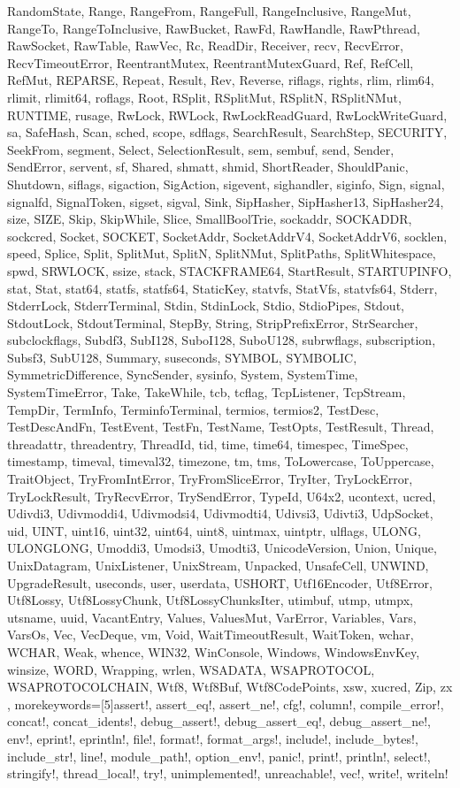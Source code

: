 {{RandomState, Range, RangeFrom, RangeFull, RangeInclusive, RangeMut, RangeTo,
RangeToInclusive, RawBucket, RawFd, RawHandle, RawPthread, RawSocket, RawTable,
RawVec, Rc, ReadDir, Receiver, recv, RecvError, RecvTimeoutError,
ReentrantMutex, ReentrantMutexGuard, Ref, RefCell, RefMut, REPARSE, Repeat,
Result, Rev, Reverse, riflags, rights, rlim, rlim64, rlimit, rlimit64, roflags,
Root, RSplit, RSplitMut, RSplitN, RSplitNMut, RUNTIME, rusage, RwLock, RWLock,
RwLockReadGuard, RwLockWriteGuard, sa, SafeHash, Scan, sched, scope, sdflags,
SearchResult, SearchStep, SECURITY, SeekFrom, segment, Select, SelectionResult,
sem, sembuf, send, Sender, SendError, servent, sf, Shared, shmatt, shmid,
ShortReader, ShouldPanic, Shutdown, siflags, sigaction, SigAction, sigevent,
sighandler, siginfo, Sign, signal, signalfd, SignalToken, sigset, sigval, Sink,
SipHasher, SipHasher13, SipHasher24, size, SIZE, Skip, SkipWhile, Slice,
SmallBoolTrie, sockaddr, SOCKADDR, sockcred, Socket, SOCKET, SocketAddr,
SocketAddrV4, SocketAddrV6, socklen, speed, Splice, Split, SplitMut, SplitN,
SplitNMut, SplitPaths, SplitWhitespace, spwd, SRWLOCK, ssize, stack,
STACKFRAME64, StartResult, STARTUPINFO, stat, Stat, stat64, statfs, statfs64,
StaticKey, statvfs, StatVfs, statvfs64, Stderr, StderrLock, StderrTerminal,
Stdin, StdinLock, Stdio, StdioPipes, Stdout, StdoutLock, StdoutTerminal, StepBy,
String, StripPrefixError, StrSearcher, subclockflags, Subdf3, SubI128, SuboI128,
SuboU128, subrwflags, subscription, Subsf3, SubU128, Summary, suseconds, SYMBOL,
SYMBOLIC, SymmetricDifference, SyncSender, sysinfo, System, SystemTime,
SystemTimeError, Take, TakeWhile, tcb, tcflag, TcpListener, TcpStream, TempDir,
TermInfo, TerminfoTerminal, termios, termios2, TestDesc, TestDescAndFn,
TestEvent, TestFn, TestName, TestOpts, TestResult, Thread, threadattr,
threadentry, ThreadId, tid, time, time64, timespec, TimeSpec, timestamp,
timeval, timeval32, timezone, tm, tms, ToLowercase, ToUppercase, TraitObject,
TryFromIntError, TryFromSliceError, TryIter, TryLockError, TryLockResult,
TryRecvError, TrySendError, TypeId, U64x2, ucontext, ucred, Udivdi3, Udivmoddi4,
Udivmodsi4, Udivmodti4, Udivsi3, Udivti3, UdpSocket, uid, UINT, uint16, uint32,
uint64, uint8, uintmax, uintptr, ulflags, ULONG, ULONGLONG, Umoddi3, Umodsi3,
Umodti3, UnicodeVersion, Union, Unique, UnixDatagram, UnixListener, UnixStream,
Unpacked, UnsafeCell, UNWIND, UpgradeResult, useconds, user, userdata, USHORT,
Utf16Encoder, Utf8Error, Utf8Lossy, Utf8LossyChunk, Utf8LossyChunksIter,
utimbuf, utmp, utmpx, utsname, uuid, VacantEntry, Values, ValuesMut, VarError,
Variables, Vars, VarsOs, Vec, VecDeque, vm, Void, WaitTimeoutResult, WaitToken,
wchar, WCHAR, Weak, whence, WIN32, WinConsole, Windows, WindowsEnvKey, winsize,
WORD, Wrapping, wrlen, WSADATA, WSAPROTOCOL, WSAPROTOCOLCHAIN, Wtf8, Wtf8Buf,
Wtf8CodePoints, xsw, xucred, Zip, zx}
%
, morekeywords=[5]{assert!, assert_eq!, assert_ne!, cfg!, column!,
compile_error!, concat!, concat_idents!, debug_assert!, debug_assert_eq!,
debug_assert_ne!, env!, eprint!, eprintln!, file!, format!, format_args!,
include!, include_bytes!, include_str!, line!, module_path!, option_env!,
panic!, print!, println!, select!, stringify!, thread_local!, try!,
unimplemented!, unreachable!, vec!, write!, writeln!}  %
}%

